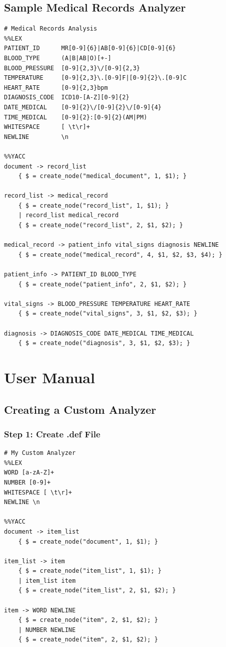 \documentclass[a4paper,12pt]{report}
\begin{document}
\section{Sample Medical Records Analyzer}
\begin{lstlisting}[caption=Medical Records .def File (Sample 8)]
# Medical Records Analysis
%%LEX
PATIENT_ID      MR[0-9]{6}|AB[0-9]{6}|CD[0-9]{6}
BLOOD_TYPE      (A|B|AB|O)[+-]
BLOOD_PRESSURE  [0-9]{2,3}\/[0-9]{2,3}
TEMPERATURE     [0-9]{2,3}\.[0-9]F|[0-9]{2}\.[0-9]C
HEART_RATE      [0-9]{2,3}bpm
DIAGNOSIS_CODE  ICD10-[A-Z][0-9]{2}
DATE_MEDICAL    [0-9]{2}\/[0-9]{2}\/[0-9]{4}
TIME_MEDICAL    [0-9]{2}:[0-9]{2}(AM|PM)
WHITESPACE      [ \t\r]+
NEWLINE         \n

%%YACC
document -> record_list
    { $ = create_node("medical_document", 1, $1); }

record_list -> medical_record
    { $ = create_node("record_list", 1, $1); }
    | record_list medical_record
    { $ = create_node("record_list", 2, $1, $2); }

medical_record -> patient_info vital_signs diagnosis NEWLINE
    { $ = create_node("medical_record", 4, $1, $2, $3, $4); }

patient_info -> PATIENT_ID BLOOD_TYPE
    { $ = create_node("patient_info", 2, $1, $2); }

vital_signs -> BLOOD_PRESSURE TEMPERATURE HEART_RATE
    { $ = create_node("vital_signs", 3, $1, $2, $3); }

diagnosis -> DIAGNOSIS_CODE DATE_MEDICAL TIME_MEDICAL
    { $ = create_node("diagnosis", 3, $1, $2, $3); }
\end{lstlisting}

\chapter{User Manual}
\thispagestyle{contentpages}

\section{Creating a Custom Analyzer}

\subsection{Step 1: Create .def File}
\begin{lstlisting}[caption=my\_analyzer.def]
# My Custom Analyzer
%%LEX
WORD [a-zA-Z]+
NUMBER [0-9]+
WHITESPACE [ \t\r]+
NEWLINE \n

%%YACC
document -> item_list
    { $ = create_node("document", 1, $1); }

item_list -> item
    { $ = create_node("item_list", 1, $1); }
    | item_list item
    { $ = create_node("item_list", 2, $1, $2); }

item -> WORD NEWLINE
    { $ = create_node("item", 2, $1, $2); }
    | NUMBER NEWLINE
    { $ = create_node("item", 2, $1, $2); }
\end{lstlisting}
\end{document}
